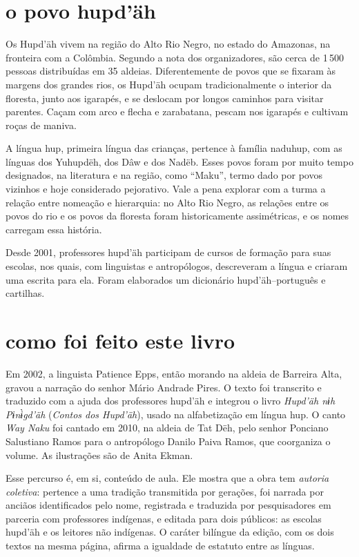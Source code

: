 \section{o povo hupd'äh}

Os Hupd'äh vivem na região do Alto Rio Negro, no estado do Amazonas, na
fronteira com a Colômbia. Segundo a nota dos organizadores, são cerca de
1\,500 pessoas distribuídas em 35 aldeias. Diferentemente de povos que
se fixaram às margens dos grandes rios, os Hupd'äh ocupam
tradicionalmente o interior da floresta, junto aos igarapés, e se
deslocam por longos caminhos para visitar parentes. Caçam com arco e
flecha e zarabatana, pescam nos igarapés e cultivam roças de maniva.

A língua hup, primeira língua das crianças, pertence à família naduhup,
com as línguas dos Yuhupdëh, dos Dâw e dos Nadëb. Esses povos foram por
muito tempo designados, na literatura e na região, como ``Maku'', termo
dado por povos vizinhos e hoje considerado pejorativo. Vale a pena
explorar com a turma a relação entre nomeação e hierarquia: no Alto Rio
Negro, as relações entre os povos do rio e os povos da floresta foram
historicamente assimétricas, e os nomes carregam essa história.

Desde 2001, professores hupd'äh participam de cursos de formação para
suas escolas, nos quais, com linguistas e antropólogos, descreveram a
língua e criaram uma escrita para ela. Foram elaborados um dicionário
hupd'äh--português e cartilhas.

\section{como foi feito este livro}

Em 2002, a linguista Patience Epps, então morando na aldeia de Barreira
Alta, gravou a narração do senhor Mário Andrade Pires. O texto foi
transcrito e traduzido com a ajuda dos professores hupd'äh e integrou o
livro \textit{Hupd'äh nɨh Pɨnɨ̀gd'äh} (\textit{Contos dos Hupd'äh}), usado
na alfabetização em língua hup. O canto \textit{Way Naku} foi cantado em
2010, na aldeia de Tat Dëh, pelo senhor Ponciano Salustiano Ramos para o
antropólogo Danilo Paiva Ramos, que coorganiza o volume. As ilustrações
são de Anita Ekman.

Esse percurso é, em si, conteúdo de aula. Ele mostra que a obra tem
\textit{autoria coletiva}: pertence a uma tradição transmitida por
gerações, foi narrada por anciãos identificados pelo nome, registrada e
traduzida por pesquisadores em parceria com professores indígenas, e
editada para dois públicos: as escolas hupd'äh e os leitores não
indígenas. O caráter bilíngue da edição, com os dois textos na mesma
página, afirma a igualdade de estatuto entre as línguas.

